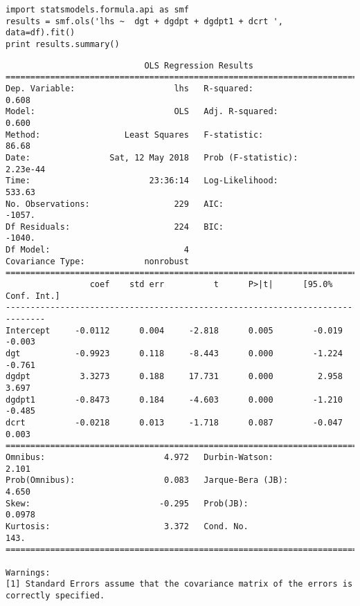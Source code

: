 \documentclass[12pt,fleqn]{article}\usepackage{../../common}
\begin{document}
\begin{verbatim}
import statsmodels.formula.api as smf
results = smf.ols('lhs ~  dgt + dgdpt + dgdpt1 + dcrt ', data=df).fit()
print results.summary()
\end{verbatim}

\begin{verbatim}
                            OLS Regression Results                            
==============================================================================
Dep. Variable:                    lhs   R-squared:                       0.608
Model:                            OLS   Adj. R-squared:                  0.600
Method:                 Least Squares   F-statistic:                     86.68
Date:                Sat, 12 May 2018   Prob (F-statistic):           2.23e-44
Time:                        23:36:14   Log-Likelihood:                 533.63
No. Observations:                 229   AIC:                            -1057.
Df Residuals:                     224   BIC:                            -1040.
Df Model:                           4                                         
Covariance Type:            nonrobust                                         
==============================================================================
                 coef    std err          t      P>|t|      [95.0% Conf. Int.]
------------------------------------------------------------------------------
Intercept     -0.0112      0.004     -2.818      0.005        -0.019    -0.003
dgt           -0.9923      0.118     -8.443      0.000        -1.224    -0.761
dgdpt          3.3273      0.188     17.731      0.000         2.958     3.697
dgdpt1        -0.8473      0.184     -4.603      0.000        -1.210    -0.485
dcrt          -0.0218      0.013     -1.718      0.087        -0.047     0.003
==============================================================================
Omnibus:                        4.972   Durbin-Watson:                   2.101
Prob(Omnibus):                  0.083   Jarque-Bera (JB):                4.650
Skew:                          -0.295   Prob(JB):                       0.0978
Kurtosis:                       3.372   Cond. No.                         143.
==============================================================================

Warnings:
[1] Standard Errors assume that the covariance matrix of the errors is correctly specified.
\end{verbatim}
\end{document}
